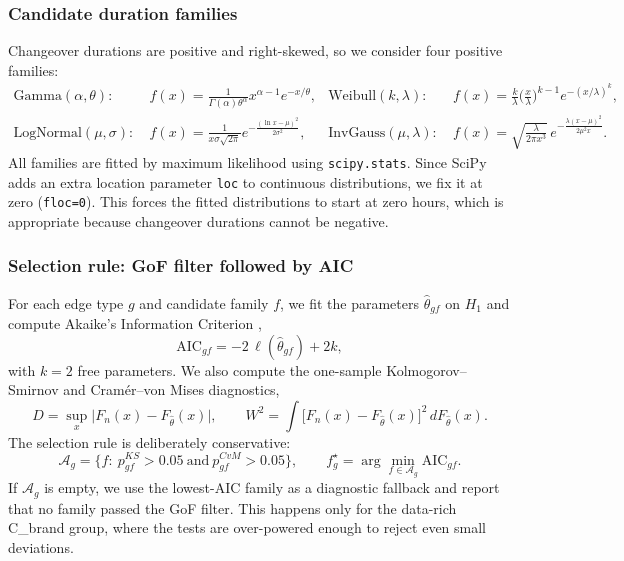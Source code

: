 \documentclass[11pt,a4paper]{article}
\begin{document}
\subsubsection{Candidate duration families}
Changeover durations are positive and right-skewed, so we consider four positive
families:
\begin{align*}
\text{Gamma}(\alpha,\theta):&\ f(x)=\tfrac{1}{\Gamma(\alpha)\theta^\alpha}x^{\alpha-1}e^{-x/\theta},
&\text{Weibull}(k,\lambda):&\ f(x)=\tfrac{k}{\lambda}\big(\tfrac{x}{\lambda}\big)^{k-1}e^{-(x/\lambda)^k},\\
\text{LogNormal}(\mu,\sigma):&\ f(x)=\tfrac{1}{x\sigma\sqrt{2\pi}}e^{-\frac{(\ln x-\mu)^2}{2\sigma^2}},
&\text{InvGauss}(\mu,\lambda):&\ f(x)=\sqrt{\tfrac{\lambda}{2\pi x^3}}\,e^{-\frac{\lambda(x-\mu)^2}{2\mu^2 x}} .
\end{align*}
All families are fitted by maximum likelihood using \texttt{scipy.stats}. Since
SciPy adds an extra location parameter \texttt{loc} to continuous distributions,
we fix it at zero (\texttt{floc=0}). This forces the fitted distributions to
start at zero hours, which is appropriate because changeover durations cannot be
negative.

\subsubsection{Selection rule: GoF filter followed by AIC}
For each edge type $g$ and candidate family $f$, we fit the parameters
$\hat\theta_{gf}$ on $H_1$ and compute Akaike's Information Criterion
\cite{akaike1974},
\begin{equation}
\text{AIC}_{gf}=-2\,\ell(\hat\theta_{gf})+2k,
\label{eq:aic}
\end{equation}
with $k=2$ free parameters. We also compute the one-sample Kolmogorov--Smirnov
\cite{massey1951} and Cram\'er--von Mises \cite{anderson1962cvm} diagnostics,
\begin{equation}
D=\sup_x\big|F_n(x)-F_{\hat\theta}(x)\big|,\qquad
W^2=\!\int\!\big[F_n(x)-F_{\hat\theta}(x)\big]^2\,dF_{\hat\theta}(x).
\label{eq:ks}
\end{equation}
The selection rule is deliberately conservative:
\[
\mathcal A_g=\{f:\ p^{KS}_{gf}>0.05\ \text{and}\ p^{CvM}_{gf}>0.05\},
\qquad
f_g^\star=\arg\min_{f\in\mathcal A_g}\text{AIC}_{gf}.
\]
If $\mathcal A_g$ is empty, we use the lowest-AIC family as a diagnostic fallback
and report that no family passed the GoF filter. This happens only for the
data-rich C\_brand group, where the tests are over-powered enough to reject even
small deviations.
\end{document}
